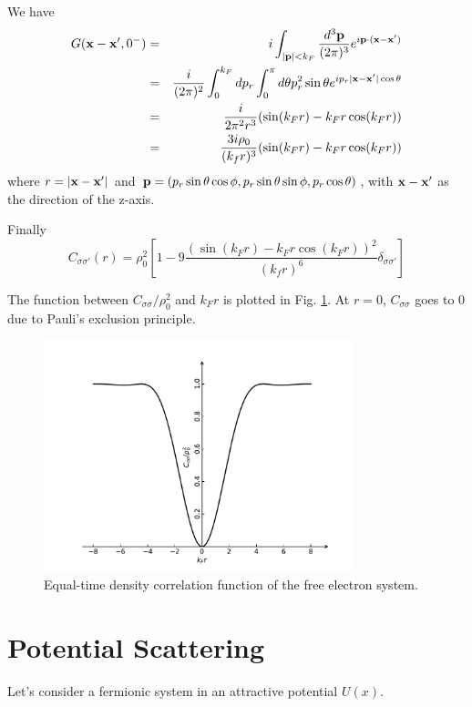 \documentclass[12pt]{book}
\begin{document}
We have
\begin{eqnarray}
	G({\bf x}-{\bf x'},0^-)&=&i\int_{|{\bf p}|<k_F}\frac{d^3{\bf p}}{(2\pi)^3}e^{i{\bf p}\cdot({\bf x}-{\bf x'})}\\
	&=&\frac i{(2\pi)^2}\int_0^{k_F}dp_r\int_0^\pi d\theta p_r^2\sin\theta e^{ip_r|{\bf x}-{\bf x'}|\cos\theta}\\
	&=&\frac i{2\pi^2r^3}(\sin(k_Fr)-k_Fr\cos(k_Fr))\\
	&=&\frac {3i\rho_0}{(k_fr)^3}(\sin(k_Fr)-k_Fr\cos(k_Fr))
\end{eqnarray}
where $r=|{\bf x}-{\bf x'}|$ and ${\bf p}=(p_r\sin\theta\cos\phi,p_r\sin\theta\sin\phi,p_r\cos\theta)$, with ${\bf x}-{\bf x'}$ as the direction of the z-axis.

Finally
\begin{equation}
	C_{\sigma\sigma'}(r)=\rho_0^2[1-9\frac{(\sin(k_Fr)-k_Fr\cos(k_Fr))^2}{(k_fr)^6}\delta_{\sigma\sigma'}]
\end{equation}

The function between $C_{\sigma\sigma}/\rho_0^2$ and $k_Fr$ is plotted in Fig. \ref{fig:eqt_corr}. At $r=0$, $C_{\sigma\sigma}$ goes to 0 due to Pauli's exclusion principle.
	\begin{figure}[htb]
		\centering  
		\includegraphics[width=0.8\textwidth]{resources/chap_ferm/fdiagapp_5.pdf}
		\caption{Equal-time density correlation function of the free electron system.}
		\label{fig:eqt_corr} 
	\end{figure}
	
\section{Potential Scattering}
	
Let's consider a fermionic system in an attractive potential $U(x)$. 
\end{document}
